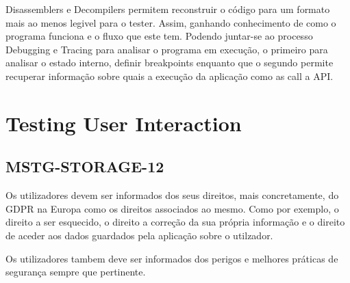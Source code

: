 Disassemblers e Decompilers permitem reconstruir o código para um formato mais ao menos legivel para o tester. Assim, ganhando conhecimento de como o programa funciona e o fluxo que este tem.
Podendo juntar-se ao processo Debugging e Tracing para analisar o programa em execução, o primeiro para analisar o estado interno, definir breakpoints enquanto que o segundo permite recuperar informação sobre quais a execução da aplicação como as call a API.

\section{Testing User Interaction}

\subsection{MSTG-STORAGE-12}

Os utilizadores devem ser informados dos seus direitos, mais concretamente, do GDPR na Europa como os direitos associados ao mesmo. Como por exemplo, o direito a ser esquecido, o direito a correção da sua própria informação e o direito de aceder aos dados guardados pela aplicação sobre o utilzador.

Os utilizadores tambem deve ser informados dos perigos e melhores práticas de segurança sempre que pertinente.


